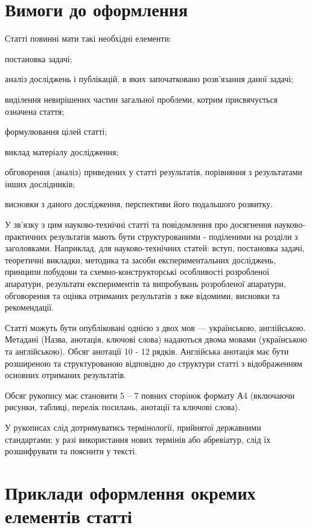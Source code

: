 \section{Вимоги до оформлення}

Статті повинні мати такі необхідні елементи: 
\begin{list}{-}{}
	\item постановка задачі; 
	\item аналіз досліджень і публікацій, в яких започатковано розв'язання даної задачі; 
	\item виділення невирішених частин загальної проблеми, котрим присвячується означена стаття; 
	\item формулювання цілей статті; 
	\item виклад матеріалу дослідження; 
	\item обговорення (аналіз) приведених у статті результатів, порівняння з результатами інших дослідників; 
	\item висновки з даного дослідження, перспективи його подальшого розвитку.
\end{list}

У зв'язку з цим науково-технічні статті та повідомлення про досягнення науково-практичних результатів мають бути структурованими - поділеними на розділи з заголовками. Наприклад, для науково-технічних статей: вступ, постановка задачі, теоретичні викладки, методика та засоби експериментальних досліджень, принципи побудови та схемно-конструкторські особливості розробленої апаратури, результати експериментів та випробувань розробленої апаратури, обговорення та оцінка отриманих результатів з вже відомими, висновки та рекомендації.

Статті можуть бути опубліковані однією  з двох мов --- українською,  англійською. Метадані (Назва, анотація, ключові слова) надаються двома мовами (українською та англійською). Обсяг анотації 10 - 12 рядків. Англійська анотація має бути розширеною та структурованою відповідно до структури статті з відображенням основних отриманих результатів.

Обсяг рукопису має становити 5 -- 7 повних сторінок формату А4 (включаючи рисунки, таблиці, перелік посилань, анотації та ключові слова).

У рукописах слід дотримуватись термінології, прийнятої державними стандартами; у разі використання нових термінів або абревіатур, слід їх розшифрувати та пояснити у тексті.



\section{Приклади оформлення окремих елементів статті}


